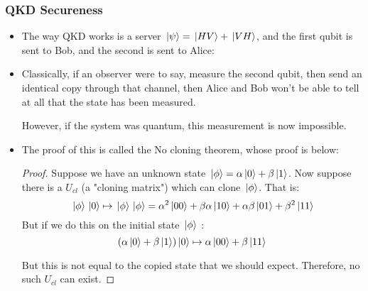 \subsubsection{QKD Secureness}
\begin{itemize}
	\item The way QKD works is a server \( \ket*{\psi} = \ket*{HV} + \ket*{VH} \), and the first qubit is sent to 
		Bob, and the second is sent to Alice: 
		\begin{center}
		\end{center}
	\item Classically, if an observer were to say, measure the second qubit, then send an identical copy through 
		that channel, then Alice and Bob won't be able to tell at all that the state has been measured. 

		However, if the system was quantum, this measurement is now impossible. 
	\item The proof of this is called the No cloning theorem, whose proof is below: 

		\begin{proof}
			Suppose we have an unknown state   \( \ket*{\phi} = \alpha \ket*{0} + \beta \ket*{1} \).  Now suppose 
			there is a \( U_{cl} \) (a "cloning matrix") which can clone \( \ket*{\phi} \). That is:
			\[
			\ket*{\phi}\ket*{0} \mapsto \ket*{\phi}\ket*{\phi} = \alpha^2 \ket*{00} 
			+ \beta \alpha \ket*{10} + \alpha \beta \ket*{01} + \beta^2 \ket*{11}
			\] 
			But if we do this on the initial state \( \ket*{\phi} \) : 
			\[
				(\alpha \ket*{0} + \beta \ket*{1}) \ket*{0} \mapsto \alpha \ket*{00} +\beta \ket*{11}
			\] 

			But this is not equal to the copied state that we should expect. Therefore, no such \( U_{cl} \) 
			can exist.
		\end{proof}
\end{itemize}
